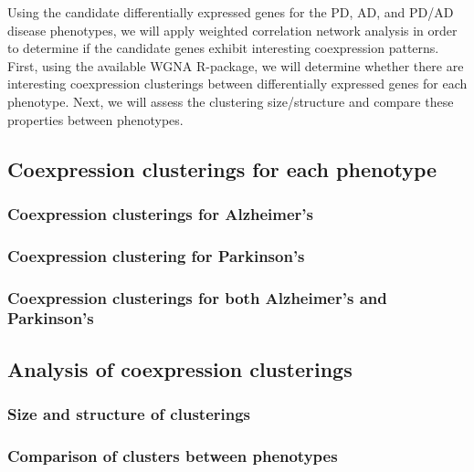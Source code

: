  Using the candidate differentially expressed genes for the PD, AD, and PD/AD disease phenotypes, we will apply weighted correlation network analysis in order to determine if the candidate genes exhibit interesting coexpression patterns. First, using the available WGNA R-package\cite{Langfelder2008}, we will determine whether there are interesting coexpression clusterings between differentially expressed genes for each phenotype. Next, we will assess the clustering size/structure and compare these properties between phenotypes.


\subsection{Coexpression clusterings for each phenotype}
\label{subsec:coexpr-clust-each}

\subsubsection{Coexpression clusterings for Alzheimer's}
\label{subsubsec:coexpr-clust-alzh}

\subsubsection{Coexpression clustering for Parkinson's}
\label{subsubsec:coexpr-clust-park}

\subsubsection{Coexpression clusterings for both Alzheimer's and Parkinson's}
\label{subsubsec:coexpr-clust-both}


\subsection{Analysis of coexpression clusterings}
\label{subsec:analys-coexpr-clust}

\subsubsection{Size and structure of clusterings}
\label{subsec:size-struct-clust}

\subsubsection{Comparison of clusters between phenotypes}
\label{subsec:comp-clust-betw}





